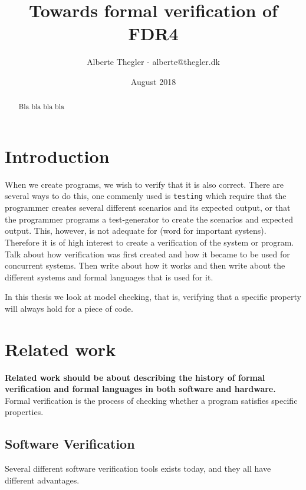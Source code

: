 \documentclass[a4paper]{article}
\title{Towards formal verification of FDR4}
\author{Alberte Thegler - alberte@thegler.dk}
\date{August 2018}
\begin{document}
\maketitle

\begin{abstract}
\begin{doublespace}
Bla bla 
bla bla


\end{doublespace}
\end{abstract}



\newpage
\tableofcontents

\newpage
\listoftodos
\newpage
{}
\section{Introduction}
When we create programs, we wish to verify that it is also correct. There are several ways to do this, one commenly used is \texttt{testing} which require that the programmer creates several different scenarios and its expected output, or that the programmer programs a test-generator to create the scenarios and expected output. This, however, is not adequate for (word for important systens). Therefore it is of high interest to create a verification of the system or program.\\
Talk about how verification was first created and how it became to be used for concurrent systems. Then write about how it works and then write about the different systems and formal languages that is used for it. 


In this thesis we look at model checking, that is, verifying that a specific property will always hold for a piece of code.
\section{Related work}
\textbf{Related work should be about describing the history of formal verification and formal languages in both software and hardware.}
Formal verification is the process of checking whether a program satisfies specific properties. 
\subsection{Software Verification}
Several different software verification tools exists today, and they all have different advantages.
\end{document}
